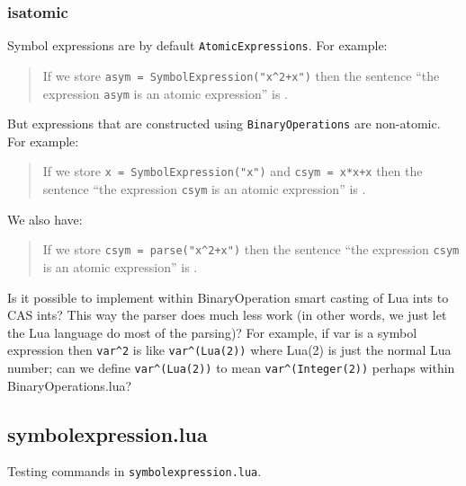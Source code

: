 \documentclass{article}
\begin{document}
\subsubsection{isatomic} 
Symbol expressions are by default \verb|AtomicExpressions|. For example: 
\begin{quote} 
If we store \verb|asym = SymbolExpression("x^2+x")| then the sentence ``the expression \verb|asym| is an atomic expression'' is 
.
\end{quote}
But expressions that are constructed using \verb|BinaryOperations| are non-atomic. For example:
\begin{quote}
    If we store \verb|x = SymbolExpression("x")| and \verb|csym = x*x+x| then the sentence ``the expression \verb|csym| is an atomic expression'' is
    .
\end{quote}
We also have:
\begin{quote}
    If we store \verb|csym = parse("x^2+x")| then the sentence ``the expression \verb|csym| is an atomic expression'' is
    .
\end{quote}
{\color{red} 
    Is it possible to implement within {\ttfamily BinaryOperation} smart casting of Lua ints to CAS ints? This way the parser does much less work (in other words, we just let the Lua language do most of the parsing)? For example, if {\ttfamily var} is a symbol expression then \verb|var^2| is like \verb|var^(Lua(2))| where {\ttfamily Lua(2)} is just the normal Lua number; can we define \verb|var^(Lua(2))| to mean \verb|var^(Integer(2))| perhaps within {\ttfamily BinaryOperations.lua}?}
\begin{comment}
    \begin{CAS}[var='x','y']
        x=Integer('12341234098134509898234324')
        f = x^2+x -- the 2 here is interpreted as Integer(2)
        disp(DD(f,x))
    \end{CAS}
\end{comment}


\subsection{symbolexpression.lua} 
Testing commands in \verb|symbolexpression.lua|. 
\end{document}
